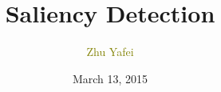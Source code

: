 \documentclass[notheorems,serif,table,compress]{beamer}  %
\begin{document}
\title{Saliency Detection}
\author[]{\textcolor{olive}{Zhu Yafei}}
\date[March 13, 2015]{March 13, 2015}
\frame{ \titlepage }
\def\hilite<#1>{\temporal<#1>{\color{blue!15}}{\color{black}}{\color{black}}}
\newcommand{\shadow}[2][purple]{\hskip5pt\shadowbox{\color{#1}\small \kai #2\vspace{3mm}}}
\newcommand{\colorrbox}[2][purple]{\doublebox{\color{#1}\small \kai#2}}

\end{document}
